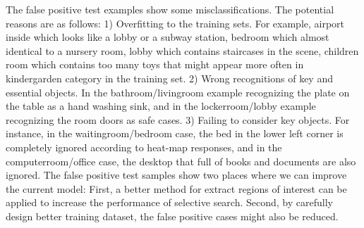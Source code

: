 The false positive test examples show some misclassifications. The potential reasons are as follows: 1) Overfitting to the training sets. For example, airport inside which looks like a lobby or a subway station, bedroom which almost identical to a nursery room, lobby which contains staircases in the scene, children room which contains too many toys that might appear more often in kindergarden category in the training set. 2) Wrong recognitions of key and essential objects. In the bathroom/livingroom example recognizing the plate on the table as a hand washing sink, and in the lockerroom/lobby example recognizing the room doors as safe cases. 3) Failing to consider key objects. For instance, in the waitingroom/bedroom case, the bed in the lower left corner is completely ignored according to heat-map responses, and in the computerroom/office case, the desktop that full of books and documents are also ignored. The false positive test samples show two places where we can improve the current model: First, a better method for extract regions of interest can be applied to increase the performance of selective search. Second, by carefully design better training dataset, the false positive cases might also be reduced.
